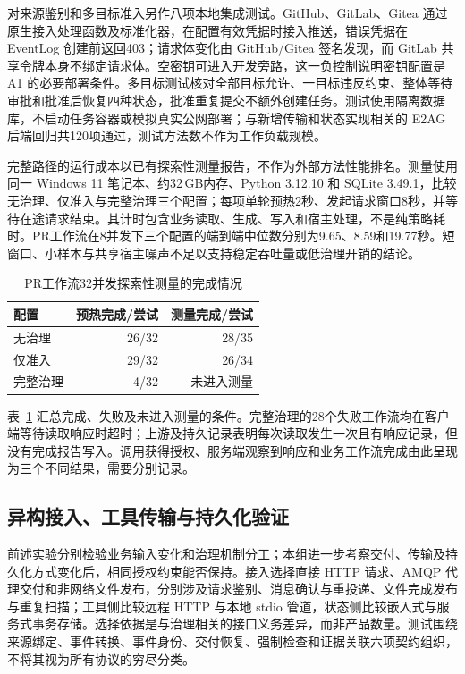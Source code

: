 对来源鉴别和多目标准入另作八项本地集成测试。GitHub、GitLab、Gitea 通过原生接入处理函数及标准化器，在配置有效凭据时接入推送，错误凭据在 EventLog 创建前返回403；请求体变化由 GitHub/Gitea 签名发现，而 GitLab 共享令牌本身不绑定请求体。空密钥可进入开发旁路，这一负控制说明密钥配置是 A1 的必要部署条件。多目标测试核对全部目标允许、一目标违反约束、整体等待审批和批准后恢复四种状态，批准重复提交不额外创建任务。测试使用隔离数据库，不启动任务容器或模拟真实公网部署；与新增传输和状态实现相关的 E2AG 后端回归共120项通过，测试方法数不作为工作负载规模。

完整路径的运行成本以已有探索性测量报告，不作为外部方法性能排名。测量使用同一 Windows 11 笔记本、约32\,GB内存、Python 3.12.10 和 SQLite 3.49.1，比较无治理、仅准入与完整治理三个配置；每项单轮预热2秒、发起请求窗口8秒，并等待在途请求结束。其计时包含业务读取、生成、写入和宿主处理，不是纯策略耗时。PR工作流在8并发下三个配置的端到端中位数分别为9.65、8.59和19.77秒。短窗口、小样本与共享宿主噪声不足以支持稳定吞吐量或低治理开销的结论。

\begin{table}[htbp]
\centering
\caption{PR工作流32并发探索性测量的完成情况}
\label{tab:exploratory-rr022}
\small
\begin{tabular}{lrr}
\toprule
配置 & 预热完成/尝试 & 测量完成/尝试 \\
\midrule
无治理 & 26/32 & 28/35 \\
仅准入 & 29/32 & 26/34 \\
完整治理 & 4/32 & 未进入测量 \\
\bottomrule
\end{tabular}
\end{table}

表~\ref{tab:exploratory-rr022} 汇总完成、失败及未进入测量的条件。完整治理的28个失败工作流均在客户端等待读取响应时超时；上游及持久记录表明每次读取发生一次且有响应记录，但没有完成报告写入。调用获得授权、服务端观察到响应和业务工作流完成由此呈现为三个不同结果，需要分别记录。

\subsection{异构接入、工具传输与持久化验证}
\label{sec:heterogeneity-rr022}

前述实验分别检验业务输入变化和治理机制分工；本组进一步考察交付、传输及持久化方式变化后，相同授权约束能否保持。接入选择直接 HTTP 请求、AMQP 代理交付和非网络文件发布，分别涉及请求鉴别、消息确认与重投递、文件完成发布与重复扫描；工具侧比较远程 HTTP 与本地 stdio 管道，状态侧比较嵌入式与服务式事务存储。选择依据是与治理相关的接口义务差异，而非产品数量。测试围绕来源绑定、事件转换、事件身份、交付恢复、强制检查和证据关联六项契约组织，不将其视为所有协议的穷尽分类。

